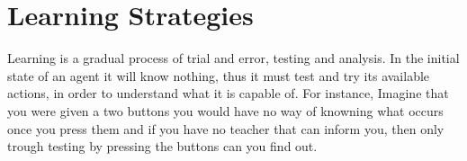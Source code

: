 \documentclass[master.tex]{subfiles}
\begin{document}
	\begin{comment}

	    \section*{Sec1}

	    Learning has two important steps to it, the first is figuring out
	    what to do in order to learn about something and the second is analysis
	    of what occured to understand and actually learn about it.


	    Analysing an outcome is about figuring out what occured and what did
	    not occur. For instance if one pressed

	    In a STRIPS domain, all actions are absolute thus we know that if
	    an action changed the state then the action's preconditions was satisfied
	    and all predicates added
    \end{comment}



    \section*{Learning Strategies} \label{sec:strats}

    Learning is a gradual process of trial and error, testing and analysis.
    In the initial state of an agent it will know nothing, thus it must
    test and try its available actions, in order to understand what it
    is capable of. For instance, Imagine that you were given a two buttons
    you would have no way of knowning what occurs once you press them
    and if you have no teacher that can inform you, then only trough testing
    by pressing the buttons can you find out.
\end{document}
